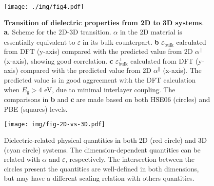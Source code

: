 \documentclass[journal=ancac3,manuscript=article,email=true,hyperref=true,keywords=false]{achemso}
\begin{document}

\begin{figure}[htbp]
\centering
\texttt{[image: ./img/fig4.pdf]}
\caption{\label{fig-4} \textbf{Transition of dielectric properties
    from 2D to 3D systems}. \textbf{a}. Scheme for the 2D-3D
  transition. $\alpha$ in the 2D material is essentially equivalent to
  $\varepsilon$ in its bulk counterpart. \textbf{b}
  $\varepsilon_{\mathrm{bulk}}^{\parallel}$ calculated from DFT
  (y-axis) compared with the predicted value from 2D
  $\alpha^{\parallel}$ (x-axis), showing good correlation. \textbf{c}
  $\varepsilon_{\mathrm{bulk}}^{\perp}$ calculated from DFT (y-axis)
  compared with the predicted value from 2D $\alpha^{\parallel}$
  (x-axis). The predicted value is in good aggreement with the DFT
  calculation when $E_{\mathrm{g}}>4$ eV, due to minimal interlayer
  coupling. The comparisons in \textbf{b} and \textbf{c} are made
  based on both HSE06 (circles) and PBE (squares) levels.}
\end{figure}

\begin{figure}[htbp]
\centering
\texttt{[image: img/fig-2D-vs-3D.pdf]}
\caption{\label{fig-2D-3D} Dielectric-related physical quantities in
  both 2D (red circle) and 3D (cyan circle) systems. The
  dimension-dependent quantities can be related with $\alpha$ and
  $\varepsilon$, respectively. The intersection between the circles
  present the quantities are well-defined in both dimensions, but may have a
  different scaling relation with others quantities.}
\end{figure}
\end{document}
